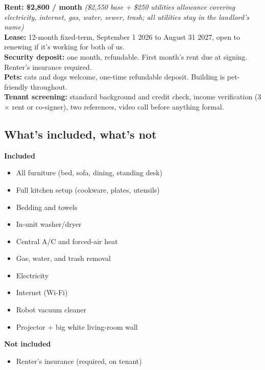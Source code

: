 \documentclass[11pt,a4paper]{article}
\begin{document}
\begin{tcolorbox}[
  enhanced, colback=brandbg2, colframe=brandred, boxrule=0pt,
  borderline west={3pt}{0pt}{brandred},
  arc=2pt, left=14pt, right=14pt, top=10pt, bottom=10pt,
]
\textbf{\large Rent: \$2,800 / month} \emph{(\$2,550 base + \$250 utilities allowance covering electricity, internet, gas, water, sewer, trash; all utilities stay in the landlord's name)} \\
\textbf{Lease:} 12-month fixed-term, September 1 2026 to August 31 2027, open to renewing if it's working for both of us. \\
\textbf{Security deposit:} one month, refundable. First month's rent due at signing. Renter's insurance required. \\
\textbf{Pets:} cats and dogs welcome, one-time refundable deposit. Building is pet-friendly throughout. \\
\textbf{Tenant screening:} standard background and credit check, income verification (3$\times$ rent or co-signer), two references, video call before anything formal.
\end{tcolorbox}

\subsection*{What's included, what's not}

\begin{minipage}[t]{0.48\linewidth}
{\sansheading\bfseries\color{brandgreen}Included}
\begin{itemize}[leftmargin=1em,nosep,after=\strut]
\item All furniture (bed, sofa, dining, standing desk)
\item Full kitchen setup (cookware, plates, utensils)
\item Bedding and towels
\item In-unit washer/dryer
\item Central A/C and forced-air heat
\item Gas, water, and trash removal
\item Electricity
\item Internet (Wi-Fi)
\item Robot vacuum cleaner
\item Projector + big white living-room wall
\end{itemize}
\end{minipage}\hfill
\begin{minipage}[t]{0.48\linewidth}
{\sansheading\bfseries\color{brandamber}Not included}
\begin{itemize}[leftmargin=1em,nosep,after=\strut]
\item Renter's insurance (required, on tenant)
\end{itemize}
\end{minipage}
\end{document}
